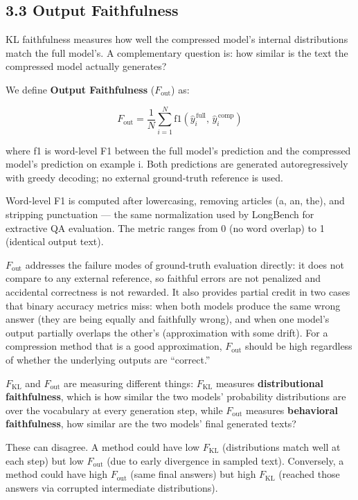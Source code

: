\documentclass[10pt,letterpaper]{article}
\begin{document}
\hypertarget{output-faithfulness}{%
\subsection{3.3 Output Faithfulness}\label{output-faithfulness}}

KL faithfulness measures how well the compressed model's internal
distributions match the full model's. A complementary question is: how
similar is the text the compressed model actually generates?

We define \textbf{Output Faithfulness} (\(F_{\text{out}}\)) as:

\[
F_{\text{out}} = \frac{1}{N} \sum_{i=1}^{N}
  \text{f1}\!\left(\hat{y}^{\,\text{full}}_i,\, \hat{y}^{\,\text{comp}}_i\right)
\]

where f1 is word-level F1 between the full model's prediction and the
compressed model's prediction on example i. Both predictions are
generated autoregressively with greedy decoding; no external
ground-truth reference is used.

Word-level F1 is computed after lowercasing, removing articles (a, an,
the), and stripping punctuation --- the same normalization used by
LongBench for extractive QA evaluation. The metric ranges from 0 (no
word overlap) to 1 (identical output text).

\(F_{\text{out}}\) addresses the failure modes of ground-truth
evaluation directly: it does not compare to any external reference, so
faithful errors are not penalized and accidental correctness is not
rewarded. It also provides partial credit in two cases that binary
accuracy metrics miss: when both models produce the same wrong answer
(they are being equally and faithfully wrong), and when one model's
output partially overlaps the other's (approximation with some drift).
For a compression method that is a good approximation,
\(F_{\text{out}}\) should be high regardless of whether the underlying
outputs are ``correct.''

\(F_{\text{KL}}\) and \(F_{\text{out}}\) are measuring different things:
\(F_{\text{KL}}\) measures \textbf{distributional faithfulness}, which is how
similar the two models' probability distributions are over the
vocabulary at every generation step, while \(F_{\text{out}}\) measures
\textbf{behavioral faithfulness}, how similar are the two models' final
generated texts?

These can disagree. A method could have low \(F_{\text{KL}}\)
(distributions match well at each step) but low \(F_{\text{out}}\) (due
to early divergence in sampled text). Conversely, a method could have
high \(F_{\text{out}}\) (same final answers) but high \(F_{\text{KL}}\)
(reached those answers via corrupted intermediate distributions).
\end{document}
